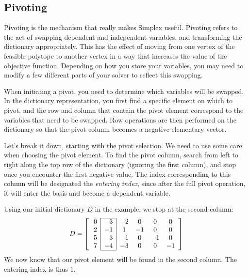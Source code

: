 \subsection*{Pivoting} %

Pivoting is the mechanism that really makes Simplex useful.
Pivoting refers to the act of swapping dependent and independent variables, and transforming the dictionary appropriately.
This has the effect of moving from one vertex of the feasible polytope to another vertex in a way that increases the value of the objective function.
Depending on how you store your variables, you may need to modify a few different parts of your solver to reflect this swapping.

When initiating a pivot, you need to determine which variables will be swapped.
In the dictionary representation, you first find a specific element on which to pivot, and the row and column that contain the pivot element correspond to the variables that need to be swapped.
Row operations are then performed on the dictionary so that the pivot column becomes a negative elementary vector.

Let's break it down, starting with the pivot selection.
We need to use some care when choosing the pivot element.
To find the pivot column, search from left to right along the top row of the dictionary (ignoring the first column), and stop once you encounter the first negative value.
The index corresponding to this column will be designated the \emph{entering index}, since after the full pivot operation, it will enter
the basis and become a dependent variable.

Using our initial dictionary $D$ in the example, we stop at the second column:
\[ D = \left[ \:
\begin{array}{*{7}{c}}
\cline{2-2}
0 & \multicolumn{1}{|c}{-3} & \multicolumn{1}{|c}{-2} & 0 & 0 & 0\\
2 & \multicolumn{1}{|c}{-1} & \multicolumn{1}{|c}{1} & -1 & 0 & 0\\
5 & \multicolumn{1}{|c}{-3} & \multicolumn{1}{|c}{-1} & 0 & -1 & 0\\
7 & \multicolumn{1}{|c}{-4} & \multicolumn{1}{|c}{-3} & 0 & 0 & -1\\
\cline{2-2}
\end{array}
\right] \]
We now know that our pivot element will be found in the second column.
The entering index is thus $1$.

